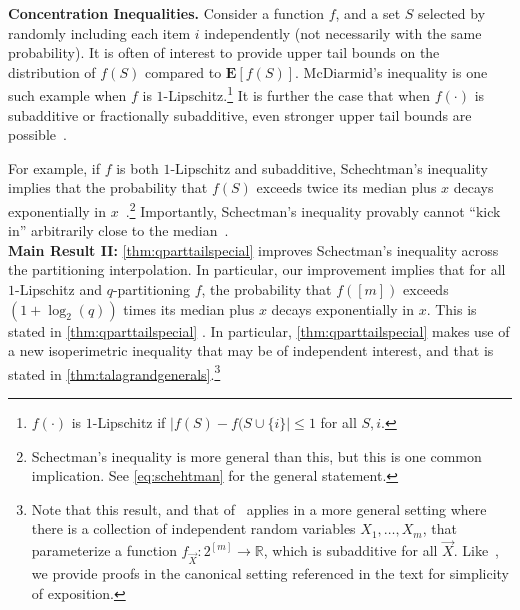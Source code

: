 \documentclass[11pt]{article}%
\numberwithin{theorem}{subsection}
\newcommand{\expect}{\mathbf{E}}
\begin{document}
\noindent\textbf{Concentration Inequalities.} Consider a function $f$, and a set $S$ selected by randomly including each item $i$ independently (not necessarily with the same probability). It is often of interest to provide upper tail bounds on the distribution of $f(S)$ compared to $\expect[f(S)]$. McDiarmid's inequality is one such example when $f$ is $1$-Lipschitz.\footnote{$f(\cdot)$ is $1$-Lipschitz if $|f(S) - f(S \cup \{i\}| \leq 1$ for all $S,i$.} It is further the case that when $f(\cdot)$ is subadditive or fractionally subadditive, even stronger upper tail bounds are possible~\cite{Vondrak10}.


For example, if $f$ is both $1$-Lipschitz and subadditive, Schechtman's inequality implies that the probability that $f(S)$ exceeds twice its median plus $x$ decays exponentially in $x$~\cite{schectman}.\footnote{Schectman's inequality is more general than this, but this is one common implication. See \cref{eq:schehtman} for the general statement.} Importantly, Schectman's inequality provably cannot ``kick in'' arbitrarily close to the median~\cite{Vondrak10}.\\

\noindent\textbf{Main Result II:} \cref{thm:qparttailspecial} improves Schectman's inequality across the partitioning interpolation. In particular, our improvement implies that for all $1$-Lipschitz and $q$-partitioning $f$, the probability that $f([m])$ exceeds $(1+\log_2(q))$ times its median plus $x$ decays exponentially in $x$. This is stated in \cref{thm:qparttailspecial} . In particular, \cref{thm:qparttailspecial}  makes use of a new isoperimetric inequality that may be of independent interest, and that is stated in \cref{thm:talagrandgenerals}.\footnote{Note that this result, and that of~\cite{schectman} applies in a more general setting where there is a collection of independent random variables $X_1,\ldots, X_m$, that parameterize a function $f_{\vec{X}}: 2^{[m]}\rightarrow \mathbb{R}$, which is subadditive for all $\vec{X}$. Like~\cite{Vondrak10}, we provide proofs in the canonical setting referenced in the text for simplicity of exposition.}\\
\end{document}

